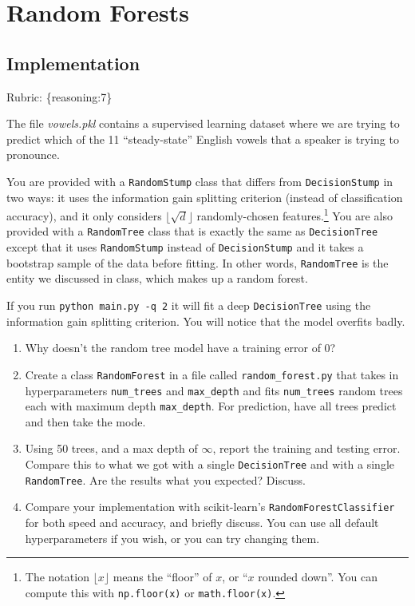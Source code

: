 \documentclass{article}
\def\blu#1{{\color{blu}#1}}
\def\gre#1{{\color{gre}#1}}
\def\enum#1{\begin{enumerate}#1\end{enumerate}}
\def\rubric#1{\gre{Rubric: \{#1\}}}{}
\begin{document}
\section{Random Forests}

\subsection{Implementation}
\rubric{reasoning:7}

The file \emph{vowels.pkl} contains a supervised learning dataset where we are trying to predict which of the 11 ``steady-state'' English vowels that a speaker is trying to pronounce.

You are provided with a \texttt{RandomStump} class that differs from
\texttt{DecisionStump} in two ways: it uses the information gain splitting criterion
(instead of classification accuracy), and
it only considers $\lfloor \sqrt{d} \rfloor$ randomly-chosen features.\footnote{The notation $\lfloor x\rfloor$ means the ``floor'' of $x$, or ``$x$ rounded down''. You can compute this with \texttt{np.floor(x)} or \texttt{math.floor(x)}.}
You are also provided with a \texttt{RandomTree} class that is exactly the same as
\texttt{DecisionTree} except that it uses \texttt{RandomStump} instead of
\texttt{DecisionStump} and it takes a bootstrap sample of the data before fitting.
In other words, \texttt{RandomTree} is the entity we discussed in class, which
makes up a random forest.

If you run \texttt{python main.py -q 2} it will fit a deep \texttt{DecisionTree}
using the information gain splitting criterion. You will notice that the model overfits badly.




\blu{
\enum{
\item Why doesn't the random tree model have a training error of 0?
\item Create a class \texttt{RandomForest} in a file called \texttt{random\string_forest.py} that takes in hyperparameters \texttt{num\string_trees} and \texttt{max\string_depth} and
fits \texttt{num\string_trees} random trees each with maximum depth \texttt{max\string_depth}. For prediction, have all trees predict and then take the mode.
\item Using 50 trees, and a max depth of $\infty$, report the training and testing error. Compare this to what we got with a single \texttt{DecisionTree} and with a single \texttt{RandomTree}. Are the results what you expected? Discuss.
\item Compare your implementation with scikit-learn's \texttt{RandomForestClassifier} for both speed and accuracy, and briefly discuss. You can use all default hyperparameters if you wish, or you can try changing them.
}
}
\end{document}
